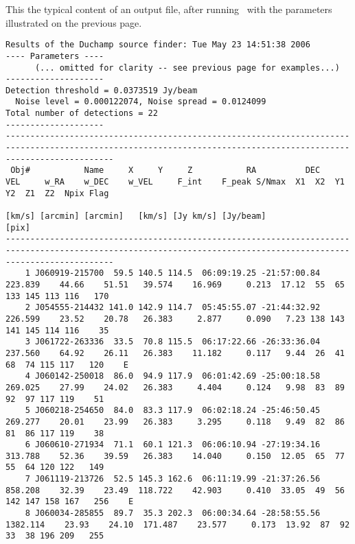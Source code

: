 \begin{landscape}
\label{app-output}
This the typical content of an output file, after running \duchamp\
with the parameters illustrated on the previous page. 

{\tiny 
  \begin{verbatim}
Results of the Duchamp source finder: Tue May 23 14:51:38 2006
---- Parameters ----
      (... omitted for clarity -- see previous page for examples...)
--------------------
Detection threshold = 0.0373519 Jy/beam
  Noise level = 0.000122074, Noise spread = 0.0124099
Total number of detections = 22
--------------------
------------------------------------------------------------------------------------------------------------------------------------------------------------------
 Obj#           Name     X     Y     Z           RA          DEC      VEL     w_RA    w_DEC    w_VEL     F_int    F_peak S/Nmax  X1  X2  Y1  Y2  Z1  Z2  Npix Flag
                                                                   [km/s] [arcmin] [arcmin]   [km/s] [Jy km/s] [Jy/beam]                                [pix]     
------------------------------------------------------------------------------------------------------------------------------------------------------------------
    1 J060919-215700  59.5 140.5 114.5  06:09:19.25 -21:57:00.84  223.839    44.66    51.51   39.574    16.969     0.213  17.12  55  65 133 145 113 116   170     
    2 J054555-214432 141.0 142.9 114.7  05:45:55.07 -21:44:32.92  226.599    23.52    20.78   26.383     2.877     0.090   7.23 138 143 141 145 114 116    35     
    3 J061722-263336  33.5  70.8 115.5  06:17:22.66 -26:33:36.04  237.560    64.92    26.11   26.383    11.182     0.117   9.44  26  41  68  74 115 117   120    E
    4 J060142-250018  86.0  94.9 117.9  06:01:42.69 -25:00:18.58  269.025    27.99    24.02   26.383     4.404     0.124   9.98  83  89  92  97 117 119    51     
    5 J060218-254650  84.0  83.3 117.9  06:02:18.24 -25:46:50.45  269.277    20.01    23.99   26.383     3.295     0.118   9.49  82  86  81  86 117 119    38     
    6 J060610-271934  71.1  60.1 121.3  06:06:10.94 -27:19:34.16  313.788    52.36    39.59   26.383    14.040     0.150  12.05  65  77  55  64 120 122   149     
    7 J061119-213726  52.5 145.3 162.6  06:11:19.99 -21:37:26.56  858.208    32.39    23.49  118.722    42.903     0.410  33.05  49  56 142 147 158 167   256    E
    8 J060034-285855  89.7  35.3 202.3  06:00:34.64 -28:58:55.56 1382.114    23.93    24.10  171.487    23.577     0.173  13.92  87  92  33  38 196 209   255     

\end{verbatim}}
\end{landscape}
